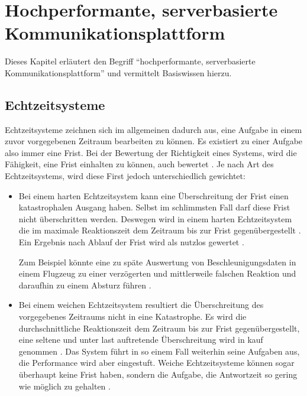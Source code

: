
\chapter{Hochperformante, serverbasierte Kommunikationsplattform}
\label{com_plattform}

Dieses Kapitel erläutert den Begriff \enquote{hochperformante, serverbasierte Kommunikationsplattform} und vermittelt Basiswissen hierzu.

\section{Echtzeitsysteme}
Echtzeitsysteme zeichnen sich im allgemeinen dadurch aus, eine Aufgabe in einem zuvor vorgegebenen Zeitraum bearbeiten zu können.
Es existiert zu einer Aufgabe also immer eine Frist.
Bei der Bewertung der Richtigkeit eines Systems, wird die Fähigkeit, eine Frist einhalten zu können, auch bewertet \cite[2]{perf:buttazzo2006soft}.
Je nach Art des Echtzeitsystems, wird diese First jedoch unterschiedlich gewichtet:

\begin{itemize}
	\item Bei einem harten Echtzeitsystem kann eine Überschreitung der Frist einen katastrophalen Ausgang haben.
	Selbst im schlimmsten Fall darf diese Frist nicht überschritten werden.
	Deswegen wird in einem harten Echtzeitsystem die im maximale Reaktionszeit dem Zeitraum bis zur Frist gegenübergestellt \cite[75]{douglass2003real}.
	Ein Ergebnis nach Ablauf der Frist wird als nutzlos gewertet \cite[2]{perf:wang2017real}.
	
	Zum Beispiel könnte eine zu späte Auswertung von Beschleunigungsdaten in einem Flugzeug zu einer verzögerten und mittlerweile falschen Reaktion und daraufhin zu einem Absturz führen \cite[5]{perf:laplante2004real}.
	
	\item Bei einem weichen Echtzeitsystem resultiert die Überschreitung des vorgegebenes Zeitraums nicht in eine Katastrophe.
	Es wird die durchschnittliche Reaktionszeit dem Zeitraum bis zur Frist gegenübergestellt, eine seltene und unter last auftretende Überschreitung wird in kauf genommen \cite[76]{douglass2003real}.
	Das System führt in so einem Fall weiterhin seine Aufgaben aus, die Performance wird aber  eingestuft.
	Weiche Echtzeitsysteme können sogar überhaupt keine Frist haben, sondern die Aufgabe, die Antwortzeit so gering wie möglich zu gehalten \cite[4]{perf:buttazzo2006soft}.
\end{itemize}

